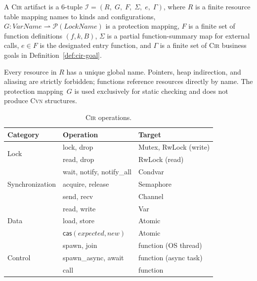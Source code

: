 \begin{definition}
\label{def:cir}
A \textsc{Cir} artifact is a 6-tuple
$\mathcal{I}=(R,\;G,\;F,\;\Sigma,\;e,\;\Gamma)$, where $R$ is a finite resource table mapping names to kinds and configurations, $G:\mathit{VarName}\rightharpoonup\mathcal{P}(\mathit{LockName})$ is a protection mapping, $F$ is a finite set of function definitions $(f,k,B)$, $\Sigma$ is a partial function-summary map for external calls, $e\in F$ is the designated entry function, and $\Gamma$ is a finite set of \textsc{Cir} business goals in Definition~\ref{def:cir-goal}.
\end{definition}

Every resource in $R$ has a unique global name. Pointers, heap indirection, and aliasing are strictly forbidden; functions reference resources directly by name. The protection mapping~$G$ is used exclusively for static checking and does not produce \textsc{Cvn} structures.

\begin{table}[t]
\caption{\textsc{Cir} operations.}
\label{tab:cir-ops}
\centering\footnotesize
\begin{tabular}{@{}llp{3.2cm}@{}}
\toprule
\textbf{Category} & \textbf{Operation} & \textbf{Target} \\
\midrule
\multirow{2}{*}{Lock}
  & \textsf{lock}, \textsf{drop}
  & Mutex, RwLock (write) \\
  & \textsf{read}, \textsf{drop}
  & RwLock (read) \\[3pt]
\multirow{3}{*}{Synchronization}
  & \textsf{wait}, \textsf{notify}, \textsf{notify\_all}
  & Condvar \\
  & \textsf{acquire}, \textsf{release}
  & Semaphore \\
  & \textsf{send}, \textsf{recv}
  & Channel \\[3pt]
\multirow{3}{*}{Data}
  & \textsf{read}, \textsf{write}
  & Var \\
  & \textsf{load}, \textsf{store}
  & Atomic \\
  & $\textsf{cas}(\mathit{expected},\mathit{new})$
  & Atomic \\[3pt]
\multirow{3}{*}{Control}
  & \textsf{spawn}, \textsf{join}
  & function (OS thread) \\
  & \textsf{spawn\_async}, \textsf{await}
  & function (async task) \\
  & \textsf{call}
  & function \\
\bottomrule
\end{tabular}
\end{table}

